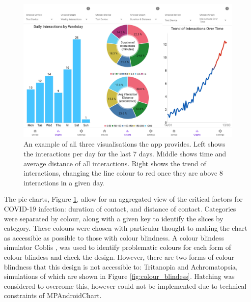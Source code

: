 \documentclass{l4proj}
\begin{document}
\begin{figure}[!htb]
    \centering
    \includegraphics[width=0.78\linewidth]{images/graphs.png}

    \caption{ An example of all three visualisations the app provides. Left shows the interactions per day for the last 7 days. Middle shows time and average distance of all interactions. Right shows the trend of interactions, changing the line colour to red once they are above 8 interactions in a given day. }

    \label{fig:app_visualisations}
\end{figure}

The pie charts, Figure \ref{fig:app_visualisations}, allow for an aggregated view of the critical factors for COVID-19 infection: duration of contact, and distance of contact. Categories were separated by colour, along with a given key to identify the slices by category. These colours were chosen with particular thought to making the chart as accessible as possible to those with colour blindness. A colour blindess simulator Coblis \citep{colblindor_coblis_2018}, was used to identify problematic colours for each form of colour blindess and check the design. However, there are two forms of colour blindness that this design is not accessible to: Tritanopia and Achromatopsia, simulations of which are shown in Figure \ref{fig:colour_blindess}. Hatching was considered to overcome this, however could not be implemented due to technical constraints of MPAndroidChart.
\end{document}
